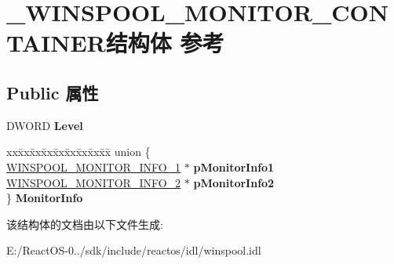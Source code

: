 \hypertarget{struct___w_i_n_s_p_o_o_l___m_o_n_i_t_o_r___c_o_n_t_a_i_n_e_r}{}\section{\+\_\+\+W\+I\+N\+S\+P\+O\+O\+L\+\_\+\+M\+O\+N\+I\+T\+O\+R\+\_\+\+C\+O\+N\+T\+A\+I\+N\+E\+R结构体 参考}
\label{struct___w_i_n_s_p_o_o_l___m_o_n_i_t_o_r___c_o_n_t_a_i_n_e_r}
\subsection*{Public 属性}
\begin{DoxyCompactItemize}
\item 
\mbox{\label{struct___w_i_n_s_p_o_o_l___m_o_n_i_t_o_r___c_o_n_t_a_i_n_e_r_a549c830d2b953c1813dbea8d2bcf8561}} 
D\+W\+O\+RD {\bfseries Level}
\item 
\mbox{\label{struct___w_i_n_s_p_o_o_l___m_o_n_i_t_o_r___c_o_n_t_a_i_n_e_r_a8a78b2964d25d8f99d9fa49e3b0b8b05}} 
\begin{tabbing}
xx\=xx\=xx\=xx\=xx\=xx\=xx\=xx\=xx\=\kill
union \{\\
\>\hyperlink{struct___w_i_n_s_p_o_o_l___m_o_n_i_t_o_r___i_n_f_o__1}{WINSPOOL\_MONITOR\_INFO\_1} $\ast$ {\bfseries pMonitorInfo1}\\
\>\hyperlink{struct___w_i_n_s_p_o_o_l___m_o_n_i_t_o_r___i_n_f_o__2}{WINSPOOL\_MONITOR\_INFO\_2} $\ast$ {\bfseries pMonitorInfo2}\\
\} {\bfseries MonitorInfo}\\

\end{tabbing}\end{DoxyCompactItemize}


该结构体的文档由以下文件生成\+:\begin{DoxyCompactItemize}
\item 
E\+:/\+React\+O\+S-\/0../sdk/include/reactos/idl/winspool.\+idl\end{DoxyCompactItemize}
